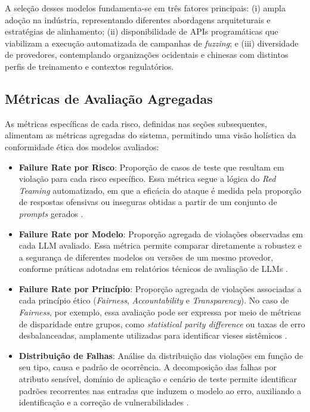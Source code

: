 A seleção desses modelos fundamenta-se em três fatores principais: (i) ampla adoção na indústria, representando diferentes abordagens arquiteturais e estratégias de alinhamento; (ii) disponibilidade de APIs programáticas que viabilizam a execução automatizada de campanhas de \textit{fuzzing}; e (iii) diversidade de provedores, contemplando organizações ocidentais e chinesas com distintos perfis de treinamento e contextos regulatórios.

\subsection{Métricas de Avaliação Agregadas}

As métricas específicas de cada risco, definidas nas seções subsequentes, alimentam as métricas agregadas do sistema, permitindo uma visão holística da conformidade ética dos modelos avaliados:

\begin{itemize}
    \item \textbf{Failure Rate por Risco}: Proporção de casos de teste que resultam em violação para cada risco específico. Essa métrica segue a lógica do \textit{Red Teaming} automatizado, em que a eficácia do ataque é medida pela proporção de respostas ofensivas ou inseguras obtidas a partir de um conjunto de \textit{prompts} gerados \cite{Perez2022}.
    
    \item \textbf{Failure Rate por Modelo}: Proporção agregada de violações observadas em cada LLM avaliado. Essa métrica permite comparar diretamente a robustez e a segurança de diferentes modelos ou versões de um mesmo provedor, conforme práticas adotadas em relatórios técnicos de avaliação de LLMs \cite{OpenAI2024, Bird2020}.
    
    \item \textbf{Failure Rate por Princípio}: Proporção agregada de violações associadas a cada princípio ético (\textit{Fairness}, \textit{Accountability} e \textit{Transparency}). No caso de \textit{Fairness}, por exemplo, essa avaliação pode ser expressa por meio de métricas de disparidade entre grupos, como \textit{statistical parity difference} ou taxas de erro desbalanceadas, amplamente utilizadas para identificar vieses sistêmicos \cite{Bellamy2019, Corbett-Davies2023}.
    
    \item \textbf{Distribuição de Falhas}: Análise da distribuição das violações em função de seu tipo, causa e padrão de ocorrência. A decomposição das falhas por atributo sensível, domínio de aplicação e cenário de teste permite identificar padrões recorrentes nas entradas que induzem o modelo ao erro, auxiliando a identificação e a correção de vulnerabilidades \cite{Perez2022}.
\end{itemize}

